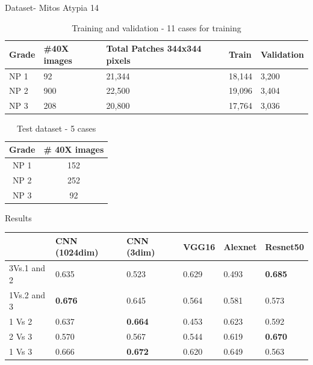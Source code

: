 \documentclass[usenames,dvipsnames]{beamer}
\begin{document}
\begin{frame}{Dataset- Mitos Atypia 14}

\begin{table}[]
\begin{tabular}{|m{1cm}|m{2cm}|m{3cm}|m{1.3cm}|m{1.3cm}|}
\hline
\centering
Grade &\centering  \#40X images &\centering Total Patches 344x344 pixels&\centering  Train & Validation \\ \hline
NP 1  & 92            & 21,344  &   18,144   & 3,200          \\ \hline
NP 2  & 900           & 22,500  &  19,096    & 3,404     \\ \hline
NP 3  & 208           & 20,800  &  17,764    & 3,036     \\ \hline
\end{tabular}
\caption{Training and validation - 11 cases for training}
\end{table}
    \begin{table}[]
\begin{tabular}{|c|c|}
\hline
Grade & \# 40X images \\ \hline
NP 1  & 152           \\ \hline
NP 2  & 252           \\ \hline
NP 3  & 92            \\ \hline
\end{tabular}
\caption{Test dataset - 5 cases}
\end{table}
\end{frame}


\begin{frame}{Results}
\begin{table}[]
\begin{tabular}{|p{1.5cm}|p{1.4cm}|p{1.3cm}|p{1.3cm}|p{1.3cm}|p{1.3cm}|}
\hline
              & CNN (1024dim)  & CNN (3dim)     & VGG16 & Alexnet & Resnet50       \\ \hline
3Vs.1 and 2 & 0.635          & 0.523          & 0.629 & 0.493  & \textbf{0.685} \\ \hline
1Vs.2 and 3 & \textbf{0.676} & 0.645          & 0.564 & 0.581  & 0.573          \\ \hline
1 Vs 2        & 0.637         & \textbf{0.664} & 0.453 & 0.623   & 0.592         \\ \hline
2 Vs 3        & 0.570          & 0.567          & 0.544 & 0.619   & \textbf{0.670} \\ \hline
1 Vs 3        & 0.666         & \textbf{0.672} & 0.620 & 0.649   & 0.563          \\ \hline
\end{tabular}
\end{table}    



\end{frame}
\end{document}
